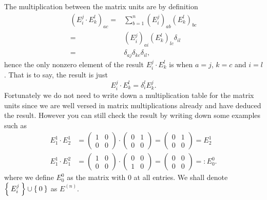 \documentclass[10pt,a4paper]{article}
\begin{document}
	The multiplication between the matrix units are by definition
	\begin{equation}
	\begin{aligned}
	(E_i^j \cdot E_k^l )_{ac}
	=& \sum_{b=1}^n (E_i^j)_{ab} (E_k^l)_{bc}\\
	=& (E_i^j)_{ai} (E_k^l)_{lc} \delta_{il}\\
	=& \delta_{aj} \delta_{kc} \delta_{il},
	\end{aligned}
	\label{MatrixUnitsMultiplicationRule}
	\end{equation}
	hence the only nonzero element of the result $E_i^j \cdot E_k^l$ is when $a=j$, $k=c$ and $i=l$. That is to say, the result is just
	\begin{equation}
	E_i^j \cdot E_k^l=\delta_{i}^{l} E_k^j.
	\end{equation}
	Fortunately we do not need to write down a multiplication table for the matrix units since we are well versed in matrix multiplications already and have deduced the result. However you can still check the result by writing down some examples such as 
	\begin{equation}
	\begin{aligned}
	E_1^1 \cdot E_2^1 &= 	
	\begin{pmatrix} 1 & 0 \\ 0 & 0 	\end{pmatrix}\cdot 
	\begin{pmatrix}	0 & 1 \\ 0 & 0 	\end{pmatrix}
	=\begin{pmatrix}	0 & 1 \\ 0 & 0 	\end{pmatrix}
	=E_2^1
	\\
	E_1^1 \cdot E_1^2 &= 	
	\begin{pmatrix} 1 & 0 \\ 0 & 0 	\end{pmatrix}\cdot 
	\begin{pmatrix}	0 & 0 \\ 1 & 0 	\end{pmatrix}
	=\begin{pmatrix}	0 & 0 \\ 0 & 0 	\end{pmatrix}
	=: E_0^0.
	\end{aligned}
	\end{equation}
	where we define $E_0^0$ as the matrix with $0$ at all entries. We shall denote $\Set{E_i^j}\cup\Set{0} $ as $E^{(n)}$.
	
\end{document}
